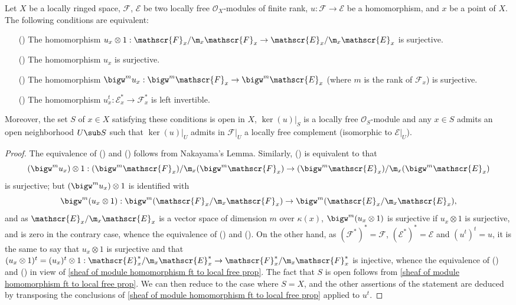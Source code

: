 \begin{corollary}\label{sheaf of module local free surjective iff}
Let $X$ be a locally ringed space, $\mathscr{F}$, $\mathscr{E}$ be two locally free $\mathscr{O}_X$-modules of finite rank, $u:\mathscr{F}\to\mathscr{E}$ be a homomorphism, and $x$ be a point of $X$. The following conditions are equivalent:
\begin{itemize}
\item[(\rmnum{1})] The homomorphism $u_x\otimes 1:\mathscr{F}_x/\m_x\mathscr{F}_x\to\mathscr{E}_x/\m_x\mathscr{E}_x$ is surjective.
\item[(\rmnum{2})] The homomorphism $u_x$ is surjective.
\item[(\rmnum{3})] The homomorphism $\bigw^mu_x:\bigw^m\mathscr{F}_x\to\bigw^m\mathscr{E}_x$ (where $m$ is the rank of $\mathscr{F}_x$) is surjective.
\item[(\rmnum{4})] The homomorphism $u_x^{t}:\mathscr{E}_x^*\to\mathscr{F}_x^*$ is left invertible.
\end{itemize}
Moreover, the set $S$ of $x\in X$ satisfying these conditions is open in $X$, $\ker(u)|_S$ is a locally free $\mathscr{O}_S$-module and any $x\in S$ admits an open neighborhood $U\sub S$ such that $\ker(u)|_U$ admits in $\mathscr{F}|_U$ a locally free complement (isomorphic to $\mathscr{E}|_U$). 
\end{corollary}
\begin{proof}
The equivalence of () and () follows from Nakayama's Lemma. Similarly, () is equivalent to that
\[(\bigw^mu_x)\otimes 1:(\bigw^m\mathscr{F}_x)/\m_x(\bigw^m\mathscr{F}_x)\to(\bigw^m\mathscr{E}_x)/\m_x(\bigw^m\mathscr{E}_x)\]
is surjective; but $(\bigw^mu_x)\otimes 1$ is identified with
\[\bigw^m(u_x\otimes 1):\bigw^m(\mathscr{F}_x/\m_x\mathscr{F}_x)\to\bigw^m(\mathscr{E}_x/\m_x\mathscr{E}_x),\]
and as $\mathscr{E}_x/\m_x\mathscr{E}_x$ is a vector space of dimension $m$ over $\kappa(x)$, $\bigw^m(u_x\otimes 1)$ is surjective if $u_x\otimes 1$ is surjective, and is zero in the contrary case, whence the equivalence of () and (). On the other hand, as $(\mathscr{F}^*)^*=\mathscr{F}$, $(\mathscr{E}^*)^*=\mathscr{E}$ and $(u^{t})^{t}=u$, it is the same to say that $u_x\otimes 1$ is surjective and that $(u_x\otimes 1)^t=(u_x)^t\otimes 1:\mathscr{E}_x^*/\m_x\mathscr{E}_x^*\to\mathscr{F}_x^*/\m_x\mathscr{F}_x^*$ is injective, whence the equivalence of () and () in view of \cref{sheaf of module homomorphism ft to local free prop}. The fact that $S$ is open follows from \cref{sheaf of module homomorphism ft to local free prop}. We can then reduce to the case where $S=X$, and the other assertions of the statement are deduced by transposing the conclusions of \cref{sheaf of module homomorphism ft to local free prop} applied to $u^t$.
\end{proof}
